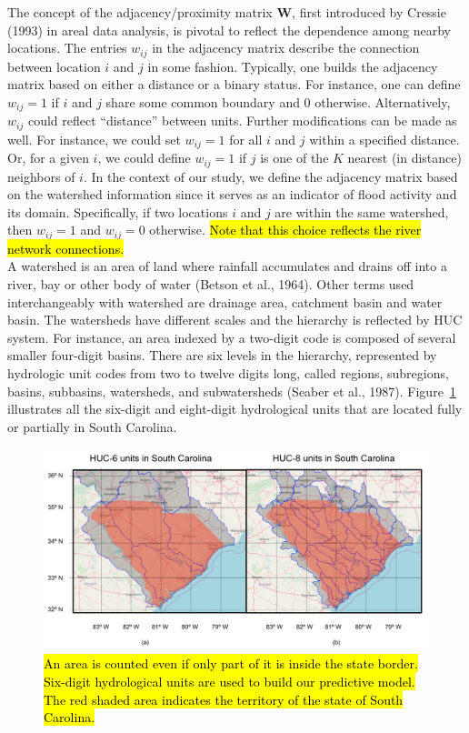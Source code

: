 The concept of the adjacency/proximity matrix $\mathbf W$, first introduced by  Cressie (1993) in areal data analysis, is pivotal to reflect the dependence among nearby locations.
The entries $ w_{ij}$ in the adjacency matrix describe the connection between location $ i$ and $j$ in some fashion.
Typically, one builds the adjacency matrix based on either a distance or a binary status.
For instance, one can define $w_{ij} = 1$ if $i$ and $j$ share some common boundary and 0 otherwise.
Alternatively, $w_{ij}$ could reflect ``distance'' between units.
Further modifications can be made as well.
For instance, we could set $w_{ij} = 1$ for all $i$ and $j$ within a specified distance.
Or,  for a given $i$, we could define $w_{ij} = 1$ if $j$ is one of the $K$ nearest (in distance) neighbors of $i$.
In the context of our study, we define the adjacency matrix based on the watershed information since it serves as an indicator of flood activity and its domain.
Specifically, if two locations $ i$ and $ j$ are within the same watershed, then $ w_{ij} = 1$ and $ w_{ij} = 0$ otherwise. \hl{Note that this choice reflects the river network connections.}\\

A watershed is an area of land where rainfall accumulates and drains off into a river, bay or other body of water (Betson et al., 1964).
Other terms used interchangeably with watershed are drainage area, catchment basin and water basin.
The watersheds have different scales and the hierarchy is reflected by HUC system.
For instance, an area indexed by a two-digit code is composed of several smaller four-digit basins.
There are six levels in the hierarchy, represented by hydrologic unit codes from two to twelve digits long, called regions, subregions, basins, subbasins, watersheds, and subwatersheds (Seaber et al., 1987).
Figure~\ref{fig:size_comp} illustrates all the six-digit and eight-digit hydrological units that are located fully or partially in South Carolina.

\begin{figure}[htbp]
\includegraphics[width=1\textwidth]{../images/huc_units_in_sc.png}
\caption{\hl{An area is counted even if only part of it is inside the state border. Six-digit hydrological units are used to build our predictive model. The red shaded area indicates the territory of the state of South Carolina.}}
\label{fig:size_comp}
\end{figure}

